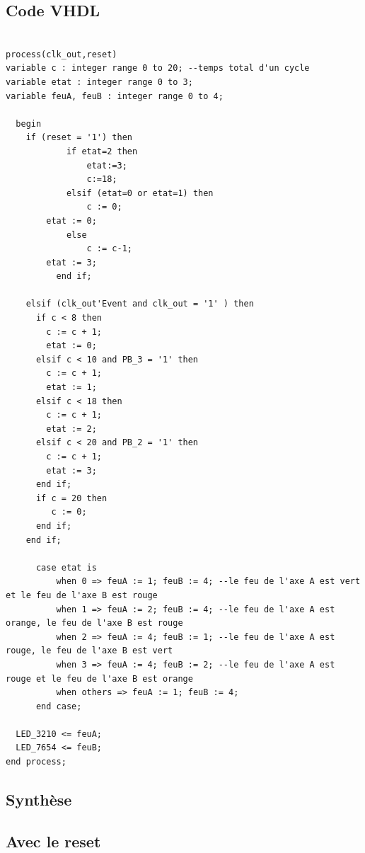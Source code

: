 \documentclass[11pt]{report}
\begin{document}
\subsection{Code VHDL}
\begin{lstlisting}

process(clk_out,reset)
variable c : integer range 0 to 20; --temps total d'un cycle
variable etat : integer range 0 to 3;
variable feuA, feuB : integer range 0 to 4;

  begin
    if (reset = '1') then
			if etat=2 then
				etat:=3;
				c:=18;
			elsif (etat=0 or etat=1) then
				c := 0;
        etat := 0;
			else
				c := c-1;
        etat := 3;
		  end if;

    elsif (clk_out'Event and clk_out = '1' ) then
      if c < 8 then
        c := c + 1;
        etat := 0;
      elsif c < 10 and PB_3 = '1' then
        c := c + 1;
        etat := 1;
      elsif c < 18 then
        c := c + 1;
        etat := 2;
      elsif c < 20 and PB_2 = '1' then
        c := c + 1;
        etat := 3;
      end if;
      if c = 20 then
         c := 0;
      end if;
    end if;

      case etat is
          when 0 => feuA := 1; feuB := 4; --le feu de l'axe A est vert et le feu de l'axe B est rouge
          when 1 => feuA := 2; feuB := 4; --le feu de l'axe A est orange, le feu de l'axe B est rouge
          when 2 => feuA := 4; feuB := 1; --le feu de l'axe A est rouge, le feu de l'axe B est vert
          when 3 => feuA := 4; feuB := 2; --le feu de l'axe A est rouge et le feu de l'axe B est orange
          when others => feuA := 1; feuB := 4;
      end case;

  LED_3210 <= feuA;
  LED_7654 <= feuB;
end process;

  \end{lstlisting}

  \subsection{Synthèse}


  \subsection{Avec le reset}
\end{document}
